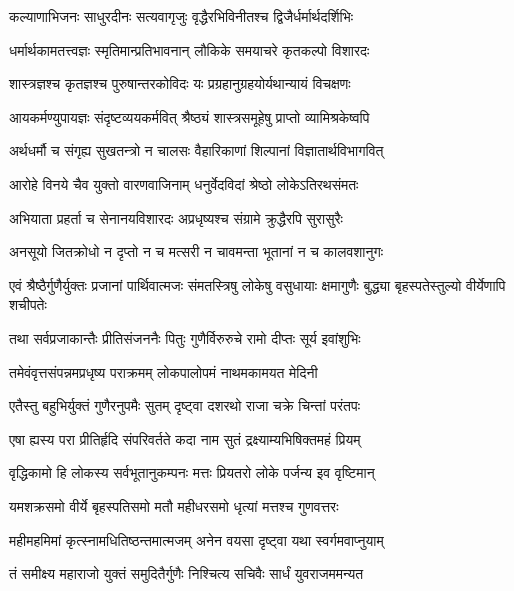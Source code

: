 \twolineshloka
{कल्याणाभिजनः साधुरदीनः सत्यवागृजुः}
{वृद्धैरभिविनीतश्च द्विजैर्धर्मार्थदर्शिभिः} %

\twolineshloka
{धर्मार्थकामतत्त्वज्ञः स्मृतिमान्प्रतिभावनान्}
{लौकिके समयाचरे कृतकल्पो विशारदः} %

\twolineshloka
{शास्त्रज्ञश्च कृतज्ञश्च पुरुषान्तरकोविदः}
{यः प्रग्रहानुग्रहयोर्यथान्यायं विचक्षणः} %

\twolineshloka
{आयकर्मण्युपायज्ञः संदृष्टव्ययकर्मवित्}
{श्रैष्ठ्यं शास्त्रसमूहेषु प्राप्तो व्यामिश्रकेष्वपि} %

\twolineshloka
{अर्थधर्मौ च संगृह्य सुखतन्त्रो न चालसः}
{वैहारिकाणां शिल्पानां विज्ञातार्थविभागवित्} %

\twolineshloka
{आरोहे विनये चैव युक्तो वारणवाजिनाम्}
{धनुर्वेदविदां श्रेष्ठो लोकेऽतिरथसंमतः} %

\twolineshloka
{अभियाता प्रहर्ता च सेनानयविशारदः}
{अप्रधृष्यश्च संग्रामे क्रुद्धैरपि सुरासुरैः} %

\twolineshloka
{अनसूयो जितक्रोधो न दृप्तो न च मत्सरी}
{न चावमन्ता भूतानां न च कालवशानुगः} %

\threelineshloka
{एवं श्रैष्ठैर्गुणैर्युक्तः प्रजानां पार्थिवात्मजः}
{संमतस्त्रिषु लोकेषु वसुधायाः क्षमागुणैः}
{बुद्ध्या बृहस्पतेस्तुल्यो वीर्येणापि शचीपतेः} %

\twolineshloka
{तथा सर्वप्रजाकान्तैः प्रीतिसंजननैः पितुः}
{गुणैर्विरुरुचे रामो दीप्तः सूर्य इवांशुभिः} %

\twolineshloka
{तमेवंवृत्तसंपन्नमप्रधृष्य पराक्रमम्}
{लोकपालोपमं नाथमकामयत मेदिनी} %

\twolineshloka
{एतैस्तु बहुभिर्युक्तं गुणैरनुपमैः सुतम्}
{दृष्ट्वा दशरथो राजा चक्रे चिन्तां परंतपः} %

\twolineshloka
{एषा ह्यस्य परा प्रीतिर्हृदि संपरिवर्तते}
{कदा नाम सुतं द्रक्ष्याम्यभिषिक्तमहं प्रियम्} %

\twolineshloka
{वृद्धिकामो हि लोकस्य सर्वभूतानुकम्पनः}
{मत्तः प्रियतरो लोके पर्जन्य इव वृष्टिमान्} %

\twolineshloka
{यमशक्रसमो वीर्ये बृहस्पतिसमो मतौ}
{महीधरसमो धृत्यां मत्तश्च गुणवत्तरः} %

\twolineshloka
{महीमहमिमां कृत्स्नामधितिष्ठन्तमात्मजम्}
{अनेन वयसा दृष्ट्वा यथा स्वर्गमवाप्नुयाम्} %

\twolineshloka
{तं समीक्ष्य महाराजो युक्तं समुदितैर्गुणैः}
{निश्चित्य सचिवैः सार्धं युवराजममन्यत} %


